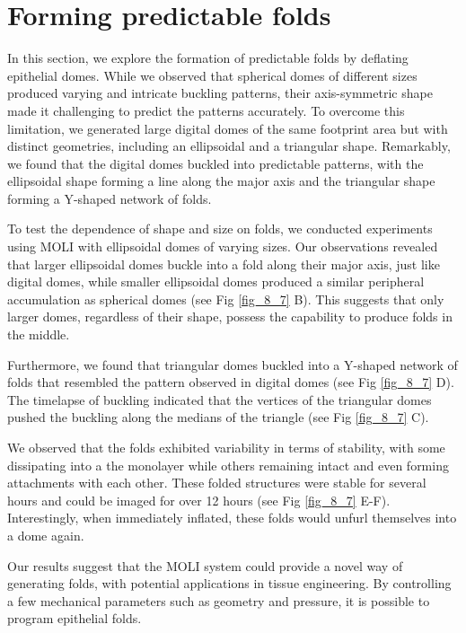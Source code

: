 \clearpage
\hypertarget{forming-predictable-folds}{%
	\section{Forming predictable folds}\label{forming-predictable-folds}}

In this section, we explore the formation of predictable folds by deflating epithelial domes. While we observed that spherical domes of different sizes produced varying and intricate buckling patterns, their axis-symmetric shape made it challenging to predict the patterns accurately. To overcome this limitation, we generated large digital domes of the same footprint area but with distinct geometries, including an ellipsoidal and a triangular shape. Remarkably, we found that the digital domes buckled into predictable patterns, with the ellipsoidal shape forming a line along the major axis and the triangular shape forming a Y-shaped network of folds.

To test the dependence of shape and size on folds, we conducted experiments using MOLI with ellipsoidal domes of varying sizes. Our observations revealed that larger ellipsoidal domes buckle into a fold along their major axis, just like digital domes, while smaller ellipsoidal domes produced a similar peripheral accumulation as spherical domes (see Fig \ref{fig_8_7} B). This suggests that only larger domes, regardless of their shape, possess the capability to produce folds in the middle.
 
Furthermore, we found that triangular domes buckled into a Y-shaped network of folds that resembled the pattern observed in digital domes (see Fig \ref{fig_8_7} D). The timelapse of buckling indicated that the vertices of the triangular domes pushed the buckling along the medians of the triangle (see Fig \ref{fig_8_7} C).

We observed that the folds exhibited variability in terms of stability, with some dissipating into a the monolayer while others remaining intact and even forming attachments with each other.  These folded structures were stable for several hours and could be imaged for over 12 hours (see Fig \ref{fig_8_7} E-F). Interestingly, when immediately inflated, these folds would unfurl themselves into a dome again.

Our results suggest that the MOLI system could provide a novel way of generating folds, with potential applications in tissue engineering. By controlling a few mechanical parameters such as geometry and pressure, it is possible to program epithelial folds.

